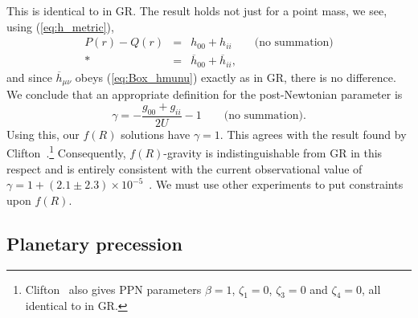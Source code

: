 \documentclass[aps,prd,amsfonts,amssymb,amsmath,nofootinbib,reprint,showpacs]{revtex4-1}
\newcommand{\eqnref}[1]{(\ref{eq:#1})}
\begin{document}
This is identical to in GR. The result holds not just for a point mass, we see, using \eqnref{h_metric},
\begin{eqnarray}
P(r) - Q(r) & = & h_{00} + h_{ii} \qquad \text{(no summation)}\nonumber \\*
 & = & \overline{h}_{00} + \overline{h}_{ii},
\end{eqnarray}
and since $\overline{h}_{\mu\nu}$ obeys \eqnref{Box_hmunu} exactly as in GR, there is no difference. We conclude that an appropriate definition for the post-Newtonian parameter is
\begin{equation}
\gamma = -\frac{g_{00} + g_{ii}}{2U} - 1 \qquad \text{(no summation)}.
\end{equation}
Using this, our $f(R)$ solutions have $\gamma = 1$. This agrees with the result found by Clifton~\cite{Clifton2008}.\footnote{Clifton~\cite{Clifton2008} also gives PPN parameters $\beta = 1$, $\zeta_1 = 0$, $\zeta_3 = 0$ and $\zeta_4 = 0$, all identical to in GR.} Consequently, $f(R)$-gravity is indistinguishable from GR in this respect and is entirely consistent with the current observational value of $\gamma = 1 + (2.1 \pm 2.3) \times 10^{-5}$~\cite{Will2006, Bertotti2003}. We must use other experiments to put constraints upon $f(R)$.

\subsection{Planetary precession}
\end{document}
